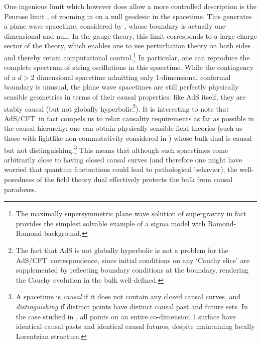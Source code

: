 \documentclass[12pt,a4paper]{article}
\def\AC{AdS/CFT}
\def\GT{gauge theory}
\begin{document}
One ingenious limit which however does allow a more controlled description is the Penrose limit \cite{penrose1976any}, of zooming in on a null geodesic in the spacetime.  This generates a plane wave spacetime, considered by \cite{Berenstein:2002jq}, whose boundary is actually one-dimensional and null.
 In the \GT, this limit corresponds to a large-charge sector of the theory, which enables one to use perturbation theory on both sides and thereby retain computational control.\footnote{
The maximally supersymmetric plane wave solution of 
supergravity  \cite{Berenstein:2002jq} in fact provides the simplest solvable example of a sigma model with Ramond-Ramond background.}  In particular, one can reproduce the complete spectrum of string oscillations in this spacetime.  
While the contingency of a $d>2$ dimensional spacetime admitting only 1-dimensional conformal boundary is unusual, the plane wave spacetimes are still perfectly physically sensible geometries in terms of their causal properties: like AdS itself, they are stably causal (but not globally hyperbolic\footnote{
The fact that AdS is not globally hyperbolic is not a problem for the \AC\ correspondence, since initial conditions on any `Cauchy slice' are supplemented by reflecting boundary conditions at the boundary, rendering the Cauchy evolution in the bulk well-defined.
}).  It is interesting to note that \AC\ in fact compels us to relax causality requirements as far as possible in the causal hierarchy: one can obtain physically sensible field theories (such as those with lightlike non-commutativity considered in \cite{Hubeny:2005qu}) whose bulk dual is causal but not distinguishing.\footnote{
A spacetime is {\it causal} if it does not contain any closed causal curves, and {\it distinguishing} if distinct points have distinct causal past and future sets.  In the case studied in  \cite{Hubeny:2005qu}, all points on an entire co-dimension 1 surface have identical causal pasts and identical causal futures, despite maintaining locally Lorentzian structure.
} 
This means that although such spacetimes come arbitrarily close to having closed causal curves (and therefore one might have worried that quantum fluctuations could lead to pathological behavior), the well-posedness of the field theory dual effectively protects the bulk from causal paradoxes.
\end{document}
